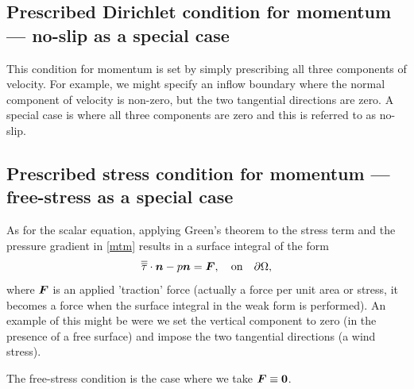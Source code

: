 \subsection{Prescribed Dirichlet condition for momentum --- no-slip as a special case}\label{sect:bc_vector_dirichlet}
This condition for momentum is set by simply prescribing all three components of
velocity. For example, we might specify an inflow boundary where the normal component
of velocity is non-zero, but the two tangential directions are zero. A special case is
where all three components are zero and this is referred to as no-slip.


\subsection{Prescribed stress condition for momentum --- free-stress as a special case}\label{sect:bc_scalar_stress}
As for the scalar equation, applying Green's theorem to the stress term and the pressure
gradient in \eqref{mtm} results in a surface integral of the form
\begin{equation}\label{StressBC}
\overline{\overline{\tau}}\cdot{\mbox{\boldmath$n$}} - p{\mbox{\boldmath$n$}} = {\mbox{\boldmath$F$}},\quad \textrm{on}\quad \partial\Omega,
\end{equation}
where ${\mbox{\boldmath$F$}}$ is an applied 'traction' force (actually a force per unit area or stress, it becomes
a force when the surface integral in the weak form is performed). An example of this might be were we set the vertical
component to zero (in the presence of a free surface) and impose the two tangential directions
(\eg a wind stress).

The free-stress condition
is the case where we take ${\mbox{\boldmath$F$}}\equiv{\mbox{\boldmath$0$}}$.


